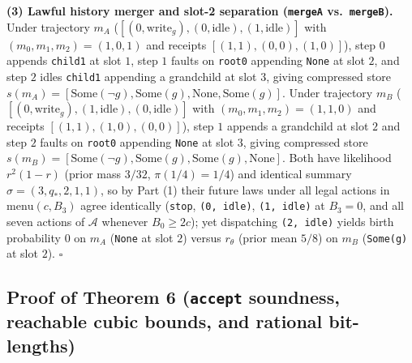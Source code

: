 \documentclass[11pt,letterpaper]{article}
\begin{document}
\textbf{(3) Lawful history merger and slot-2 separation (\texttt{mergeA}
vs.~\texttt{mergeB}).} Under trajectory \(m_A\)
(\([(0,\mathrm{write}_g), (0,\mathrm{idle}), (1,\mathrm{idle})]\) with
\((m_0,m_1,m_2) = (1,0,1)\) and receipts \([(1,1),(0,0),(1,0)]\)), step
\(0\) appends \texttt{child1} at slot \(1\), step \(1\) faults on
\texttt{root0} appending \texttt{None} at slot \(2\), and step \(2\)
idles \texttt{child1} appending a grandchild at slot \(3\), giving
compressed store
\(s(m_A) = [\mathrm{Some}(\neg g), \mathrm{Some}(g), \mathrm{None}, \mathrm{Some}(g)]\).
Under trajectory \(m_B\)
(\([(0,\mathrm{write}_g), (1,\mathrm{idle}), (0,\mathrm{idle})]\) with
\((m_0,m_1,m_2) = (1,1,0)\) and receipts \([(1,1),(1,0),(0,0)]\)), step
\(1\) appends a grandchild at slot \(2\) and step \(2\) faults on
\texttt{root0} appending \texttt{None} at slot \(3\), giving compressed
store
\(s(m_B) = [\mathrm{Some}(\neg g), \mathrm{Some}(g), \mathrm{Some}(g), \mathrm{None}]\).
Both have likelihood \(r^2(1-r)\) (prior mass \(3/32\),
\(\pi(1/4) = 1/4\)) and identical summary
\(\sigma = (3, q_*, 2, 1, 1)\), so by Part (1) their future laws under
all legal actions in \(\mathrm{menu}(c, B_3)\) agree identically
(\texttt{stop}, \texttt{(0,\ idle)}, \texttt{(1,\ idle)} at \(B_3 = 0\),
and all seven actions of \(\mathcal{A}\) whenever \(B_0 \ge 2c\)); yet
dispatching \texttt{(2,\ idle)} yields birth probability \(0\) on
\(m_A\) (\texttt{None} at slot \(2\)) versus \(r_\theta\) (prior mean
\(5/8\)) on \(m_B\) (\texttt{Some(g)} at slot \(2\)). \(\square\)

\subsection{\texorpdfstring{Proof of Theorem 6 (\texttt{accept}
soundness, reachable cubic bounds, and rational
bit-lengths)}{Proof of Theorem 6 (accept soundness, reachable cubic bounds, and rational bit-lengths)}}\label{proof-of-theorem-6-accept-soundness-reachable-cubic-bounds-and-rational-bit-lengths}
\end{document}

